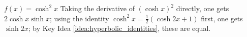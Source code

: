 {$f(x) = \cosh ^2x$}
{Taking the derivative of $(\cosh x)^2$ directly, one gets $2\cosh x\sinh x$; using the identity $\cosh^2x=\frac12(\cosh2x+1)$ first, one gets $\sinh 2x$; by Key Idea \ref{idea:hyperbolic_identities}, these are equal.}

